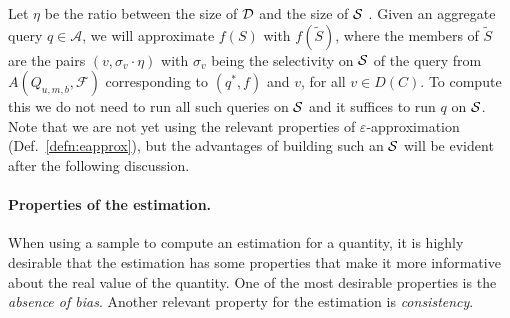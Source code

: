 Let $\eta$ be the ratio between the size of ${\cal D}$ and the size
of ${\cal S}$ . Given an aggregate query $q\in\mathcal{A}$, we will approximate
$f(S)$ with $f(\tilde{S})$, where the members of $\tilde{S}$ are the pairs
$(v,\sigma_v\cdot\eta)$ with $\sigma_v$ being the selectivity on ${\cal S}$ of the
query from $A(Q_{u,m,b},\mathcal{F})$ corresponding to $(q^*,f)$ and $v$, for
all $v\in D(C)$. To compute this we do not need to run all such queries on ${\cal S}$ and
it suffices to run $q$ on ${\cal S}$. 
Note that we are not yet using the relevant properties of
$\varepsilon$-approximation (Def.~\ref{defn:eapprox}), but the advantages of
building such an ${\cal S}$ will be evident after the following discussion.


\paragraph{Properties of the estimation.} When using a sample to compute an
estimation for a quantity, it is highly desirable that the estimation has some
properties that make it more informative about the real value of the quantity.
One of the most desirable properties is the \emph{absence of bias}.
Another relevant property for the estimation is \emph{consistency}.

